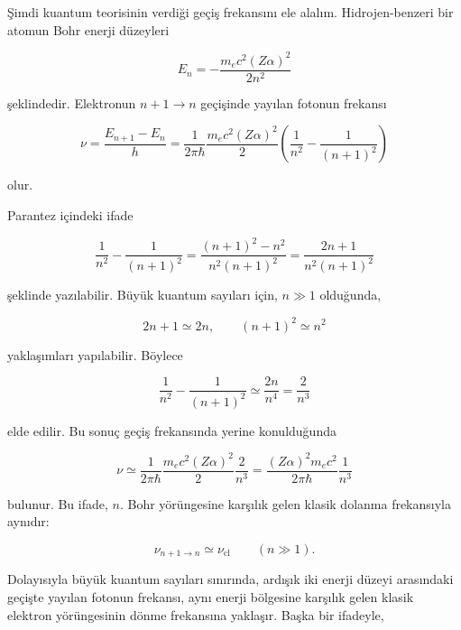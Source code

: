 \documentclass[00_kitap.tex]{subfiles}
\begin{document}
Şimdi kuantum teorisinin verdiği geçiş frekansını ele alalım. Hidrojen-benzeri
bir atomun Bohr enerji düzeyleri

\begin{equation}
	E_n
	=
	-\frac{m_ec^2(Z\alpha)^2}{2n^2}
\end{equation}

şeklindedir. Elektronun $n+1\longrightarrow n$ geçişinde yayılan fotonun
frekansı

\begin{equation}
	\nu
	=
	\frac{E_{n+1}-E_n}{h}
	=
	\frac{1}{2\pi\hbar}
	\frac{m_ec^2(Z\alpha)^2}{2}
	\left(
	\frac{1}{n^2}
	-
	\frac{1}{(n+1)^2}
	\right)
\end{equation}

olur.

Parantez içindeki ifade

\begin{equation}
	\frac{1}{n^2}
	-
	\frac{1}{(n+1)^2}
	=
	\frac{(n+1)^2-n^2}{n^2(n+1)^2}
	=
	\frac{2n+1}{n^2(n+1)^2}
\end{equation}

şeklinde yazılabilir. Büyük kuantum sayıları için, $n\gg1$ olduğunda,

\begin{equation}
	2n+1\simeq2n,
	\qquad
	(n+1)^2\simeq n^2
\end{equation}

yaklaşımları yapılabilir. Böylece

\begin{equation}
	\frac{1}{n^2}
	-
	\frac{1}{(n+1)^2}
	\simeq
	\frac{2n}{n^4}
	=
	\frac{2}{n^3}
\end{equation}

elde edilir. Bu sonuç geçiş frekansında yerine konulduğunda

\begin{equation}
	\nu
	\simeq
	\frac{1}{2\pi\hbar}
	\frac{m_ec^2(Z\alpha)^2}{2}
	\frac{2}{n^3}
	=
	\frac{(Z\alpha)^2m_ec^2}{2\pi\hbar}
	\frac{1}{n^3}
\end{equation}

bulunur. Bu ifade, $n$. Bohr yörüngesine karşılık gelen klasik dolanma
frekansıyla aynıdır:

\begin{equation}
	\boxed{
		\nu_{n+1\rightarrow n}
		\simeq
		\nu_{\mathrm{cl}}
	}
	\qquad
	(n\gg1).
\end{equation}

Dolayısıyla büyük kuantum sayıları sınırında, ardışık iki enerji düzeyi
arasındaki geçişte yayılan fotonun frekansı, aynı enerji bölgesine karşılık
gelen klasik elektron yörüngesinin dönme frekansına yaklaşır. Başka bir
ifadeyle,
\end{document}
